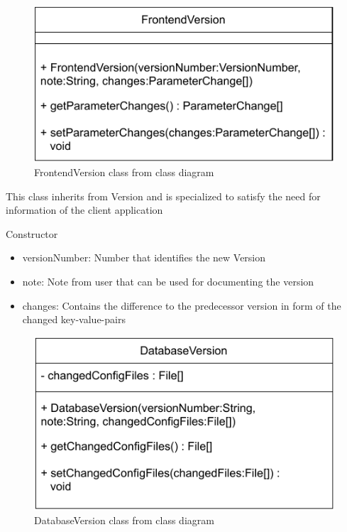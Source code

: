 \begin{figure}[h]
\centerline{\includegraphics[scale=1]{res/Klassen/FrontendVersion.pdf}}
\caption{FrontendVersion class from class diagram}
\end{figure}

This class inherits from Version and is specialized to satisfy the need for information of the client application
\begin{methodenv}{Constructor}



\begin{itemize}
	\item{versionNumber:}
	Number that identifies the new Version
	\item{note:}
	Note from user that can be used for documenting the version
	\item{changes:}
	Contains the difference to the predecessor version in form of the changed key-value-pairs
\end{itemize}
\end{methodenv}

\begin{figure}[h]
\centerline{\includegraphics[scale=1]{res/Klassen/DatabaseVersion.pdf}}
\caption{DatabaseVersion class from class diagram}
\end{figure}


